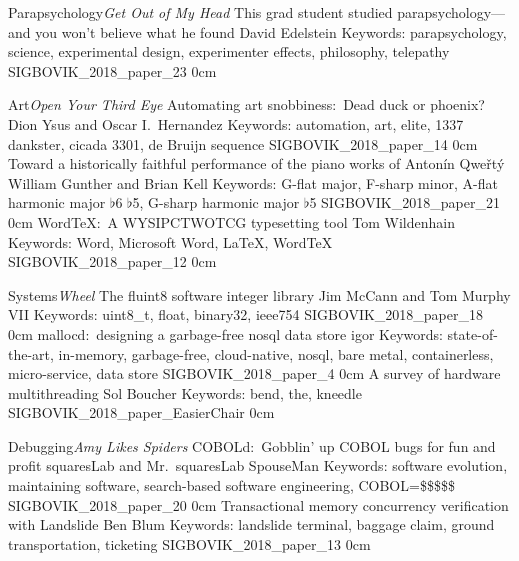 \addtrack
	{Parapsychology}{\textit{Get Out of My Head}}
\addpaper
	{This grad student studied parapsychology---and you won't believe what he found}
	{David Edelstein}
	{Keywords: parapsychology, science, experimental design, experimenter effects, philosophy, telepathy}
	{SIGBOVIK_2018_paper_23}
	{0cm}
	{}

\addtrack
	{Art}{\textit{Open Your Third Eye}}
\addpaper
	{Automating art snobbiness:\ Dead duck or phoenix?}
	{Dion Ysus and Oscar I.\ Hernandez}
	{Keywords: automation, art, elite, 1337 dankster, cicada 3301, de Bruijn sequence}
	{SIGBOVIK_2018_paper_14}
	{0cm}
	{}
\addpaper
	{Toward a historically faithful performance of the piano works of Anton\'in Qwe\v{r}t\'y}
	{William Gunther and Brian Kell}
	{Keywords: G-flat major, F-sharp minor, A-flat harmonic major $\flat$6 $\flat$5, G-sharp harmonic major $\flat$5}
	{SIGBOVIK_2018_paper_21}
	{0cm}
	{}
\addpaper
	{WordTeX:\ A WYSIPCTWOTCG typesetting tool}
	{Tom Wildenhain}
	{Keywords: Word, Microsoft Word, LaTeX, WordTeX}
	{SIGBOVIK_2018_paper_12}
	{0cm}
	{}


\addtrack
	{Systems}{\textit{Wheel}}
\addpaper
	{The fluint8 software integer library}
	{Jim McCann and Tom Murphy VII}
	{Keywords: uint8\_t, float, binary32, ieee754}
	{SIGBOVIK_2018_paper_18}
	{0cm}
	{}
\addpaper
	{mallocd:\ designing a garbage-free nosql data store}
	{igor}
	{Keywords: state-of-the-art, in-memory, garbage-free, cloud-native, nosql, bare metal, containerless, micro-service, data store}
	{SIGBOVIK_2018_paper_4}
	{0cm}
	{}
\addpaper
	{A survey of hardware multithreading}
	{Sol Boucher}
	{Keywords: bend, the, kneedle}
	{SIGBOVIK_2018_paper_EasierChair}
	{0cm}
	{}

\addtrack
	{Debugging}{\textit{Amy Likes Spiders}}
\addpaper
	{COBOLd:\ Gobblin' up COBOL bugs for fun and profit}
	{squaresLab and Mr.\ squaresLab SpouseMan}
	{Keywords: software evolution, maintaining software, search-based software engineering, COBOL=\$\$\$\$\$}
	{SIGBOVIK_2018_paper_20}
	{0cm}
	{}
\addpaper
	{Transactional memory concurrency verification with Landslide}
	{Ben Blum}
	{Keywords: landslide terminal, baggage claim, ground transportation, ticketing}
	{SIGBOVIK_2018_paper_13}
	{0cm}
	{}

